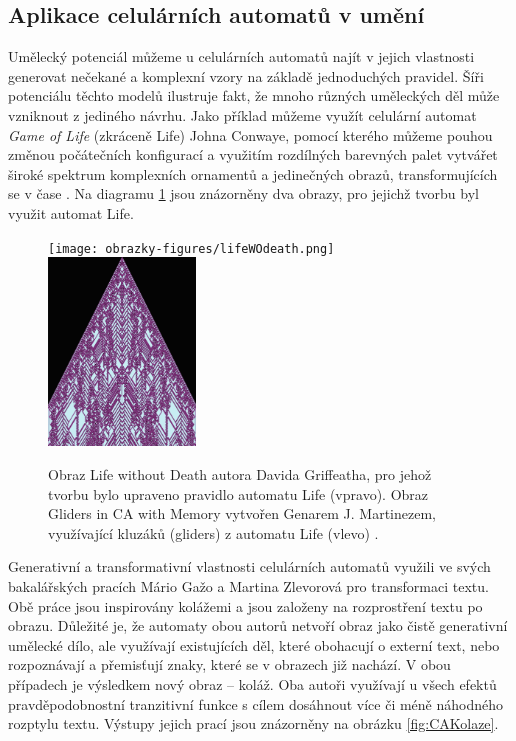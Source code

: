 \subsection*{Aplikace celulárních automatů v umění}
Umělecký potenciál můžeme u celulárních automatů najít v jejich vlastnosti generovat nečekané a komplexní vzory na základě jednoduchých pravidel. Šíři potenciálu těchto modelů ilustruje fakt, že mnoho různých uměleckých děl může vzniknout z jediného návrhu. Jako příklad můžeme využít celulární automat \emph{Game of Life} (zkráceně Life) Johna Conwaye, pomocí kterého můžeme pouhou změnou počátečních konfigurací a využitím rozdílných barevných palet vytvářet široké spektrum komplexních ornamentů a jedinečných obrazů, transformujících se v čase \cite{CAArt}. Na diagramu \ref{fig:caUmeni} jsou znázorněny dva obrazy, pro jejichž tvorbu byl využit automat Life.

\begin{figure}[H]
    \centering
    \texttt{[image: obrazky-figures/lifeWOdeath.png]}
    \hspace{0.1\textwidth}
    \includegraphics[width=0.35\textwidth]{obrazky-figures/caGliders.png}
    \caption{Obraz Life without Death autora Davida Griffeatha, pro jehož tvorbu bylo upraveno pravidlo automatu Life (vpravo). Obraz Gliders in CA with Memory vytvořen Genarem J. Martinezem, využívající kluzáků (gliders) z automatu Life (vlevo) \cite{CAArt}.}
    \label{fig:caUmeni}
\end{figure}

Generativní a transformativní vlastnosti celulárních automatů využili ve svých bakalářských pracích Mário Gažo \cite{GazoBak} a Martina Zlevorová \cite{ZlevorovaBak} pro transformaci textu. Obě práce jsou inspirovány kolážemi a jsou založeny na rozprostření textu po obrazu. Důležité je, že automaty obou autorů netvoří obraz jako čistě generativní umělecké dílo, ale využívají existujících děl, které obohacují o externí text, nebo rozpoznávají a přemisťují znaky, které se v obrazech již nachází. V obou případech je výsledkem nový obraz -- koláž. Oba autoři využívají u všech efektů pravděpodobnostní tranzitivní funkce s cílem dosáhnout více či méně náhodného rozptylu textu. Výstupy jejich prací jsou znázorněny na obrázku \ref{fig:CAKolaze}.

